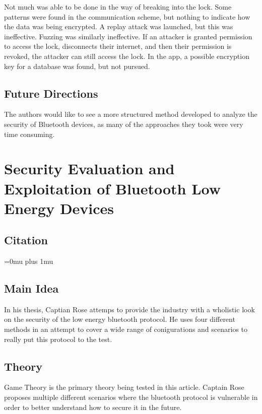 \documentclass[letterpaper,12pt]{article}
\begin{document}
\noindent
Not much was able to be done in the way of breaking into the lock. Some patterns were found in the communication scheme, but nothing to indicate how the data was being encrypted. A replay attack was launched, but this was ineffective. Fuzzing was similarly ineffective. If an attacker is granted permission to access the lock, disconnects their internet, and then their permission is revoked, the attacker can still access the lock. In the app, a possible encryption key for a database was found, but not pursued. 

\subsection{Future Directions}

\noindent
The authors would like to see a more structured method developed to analyze the security of Bluetooth devices, as many of the approaches they took were very time consuming. 

\section{Security Evaluation and Exploitation of Bluetooth Low Energy Devices}

\noindent
\subsection{Citation}

\Urlmuskip=0mu plus 1mu\relax
{}

\subsection{Main Idea}

\noindent
In his thesis, Captian Rose attemps to provide the industry with a wholistic look on the security of the low energy bluetooth protocol. He uses four different methods in an attempt to cover a wide range of conigurations and scenarios to really put this protocol to the test.

\subsection{Theory}

\noindent
Game Theory is the primary theory being tested in this article.  Captain Rose proposes multiple different scenarios where the bluetooth protocol is vulnerable in order to better understand how to secure it in the future.
\end{document}
